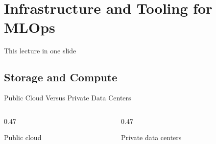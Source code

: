 
\section[Infrastructure]{Infrastructure and Tooling for MLOps}


\begin{frame}{This lecture in one slide}
  \begin{withmargin}
    \begin{tdmain}
    \end{tdmain}
    \begin{tdmargin}
    \end{tdmargin}
  \end{withmargin}
\end{frame}

\subsection{Storage and Compute}

\begin{frame}{Public Cloud Versus Private Data Centers}
  \begin{columns}[T,onlytextwidth]
    \begin{column}{0.47\textwidth}
      \begin{tdblockt}[equal height group=cloud]{Public cloud}
      \end{tdblockt}
    \end{column}
    \begin{column}{0.47\textwidth}
      \begin{tdblockt}[equal height group=cloud]{Private data centers}
      \end{tdblockt}
    \end{column}
  \end{columns}
\end{frame}

